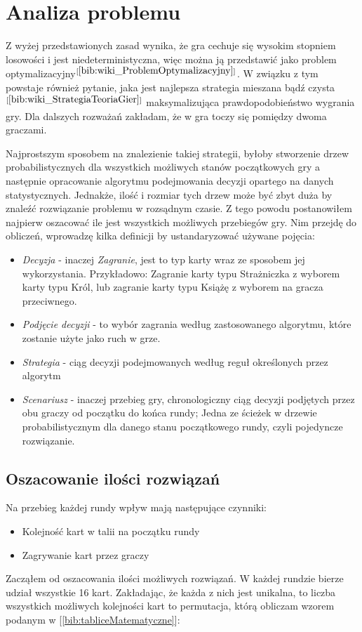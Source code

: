 \section{Analiza problemu}
\label{sec:opisProblemu}
Z wyżej przedstawionych zasad wynika, że gra cechuje się wysokim stopniem losowości i jest niedeterministyczna, więc można ją przedstawić jako problem optymalizacyjny$^{[\ref{bib:wiki_ProblemOptymalizacyjny}]}$. W związku z tym powstaje również pytanie, jaka jest najlepsza strategia mieszana bądź czysta$^{[\ref{bib:wiki_StrategiaTeoriaGier}]}$ maksymalizująca prawdopodobieństwo wygrania gry. Dla dalszych rozważań zakładam, że w gra toczy się pomiędzy dwoma graczami.

Najprostszym sposobem na znalezienie takiej strategii, byłoby stworzenie drzew probabilistycznych dla wszystkich możliwych stanów początkowych gry a następnie opracowanie algorytmu podejmowania decyzji opartego na danych statystycznych. Jednakże, ilość i rozmiar tych drzew może być zbyt duża by znaleźć rozwiązanie problemu w rozsądnym czasie. Z tego powodu postanowiłem najpierw oszacować ile jest wszystkich możliwych przebiegów gry. Nim przejdę do obliczeń, wprowadzę kilka definicji by ustandaryzować używane pojęcia:
\begin{itemize}
	\item \textit{Decyzja} - inaczej \textit{Zagranie}, jest to typ karty wraz ze sposobem jej wykorzystania. Przykładowo: Zagranie karty typu Strażniczka z wyborem karty typu Król, lub zagranie karty typu Książę z wyborem na gracza przeciwnego.
	\item \textit{Podjęcie decyzji} - to wybór zagrania według zastosowanego algorytmu, które zostanie użyte jako ruch w grze.
	\item \textit{Strategia} - ciąg decyzji podejmowanych według reguł określonych przez algorytm
	\item \textit{Scenariusz} - inaczej przebieg gry, chronologiczny ciąg decyzji podjętych przez obu graczy od początku do końca rundy; Jedna ze ścieżek w drzewie probabilistycznym dla danego stanu początkowego rundy, czyli pojedyncze rozwiązanie.
\end{itemize}

\subsection*{Oszacowanie ilości rozwiązań}
Na przebieg każdej rundy wpływ mają następujące czynniki:
\begin{itemize}
	\item Kolejność kart w talii na początku rundy
	\item Zagrywanie kart przez graczy
\end{itemize}
Zacząłem od oszacowania ilości możliwych rozwiązań. W każdej rundzie bierze udział wszystkie 16 kart. Zakładając, że każda z nich jest unikalna, to  liczba wszystkich możliwych kolejności kart to permutacja, którą obliczam wzorem podanym w [\ref{bib:tabliceMatematyczne}]:

